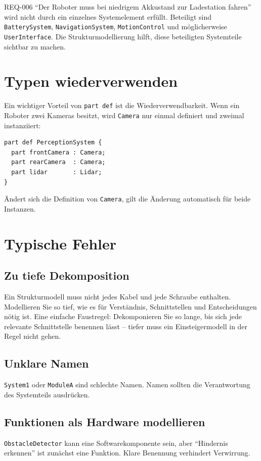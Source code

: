\begin{praxisbox}
REQ-006 \enquote{Der Roboter muss bei niedrigem Akkustand zur Ladestation fahren} wird nicht durch ein einzelnes Systemelement erfüllt. Beteiligt sind \texttt{BatterySystem}, \texttt{NavigationSystem}, \texttt{MotionControl} und möglicherweise \texttt{UserInterface}. Die Strukturmodellierung hilft, diese beteiligten Systemteile sichtbar zu machen.
\end{praxisbox}

\section{Typen wiederverwenden}
Ein wichtiger Vorteil von \texttt{part def} ist die Wiederverwendbarkeit. Wenn ein Roboter zwei Kameras besitzt, wird \texttt{Camera} nur einmal definiert und zweimal instanziiert:

\begin{lstlisting}
part def PerceptionSystem {
  part frontCamera : Camera;
  part rearCamera  : Camera;
  part lidar       : Lidar;
}
\end{lstlisting}

Ändert sich die Definition von \texttt{Camera}, gilt die Änderung automatisch für beide Instanzen.

\section{Typische Fehler}
\subsection{Zu tiefe Dekomposition}
Ein Strukturmodell muss nicht jedes Kabel und jede Schraube enthalten. Modellieren Sie so tief, wie es für Verständnis, Schnittstellen und Entscheidungen nötig ist. Eine einfache Faustregel: Dekomponieren Sie so lange, bis sich jede relevante Schnittstelle benennen lässt – tiefer muss ein Einsteigermodell in der Regel nicht gehen.

\subsection{Unklare Namen}
\texttt{System1} oder \texttt{ModuleA} sind schlechte Namen. Namen sollten die Verantwortung des Systemteils ausdrücken.

\subsection{Funktionen als Hardware modellieren}
\texttt{ObstacleDetector} kann eine Softwarekomponente sein, aber \enquote{Hindernis erkennen} ist zunächst eine Funktion. Klare Benennung verhindert Verwirrung.

